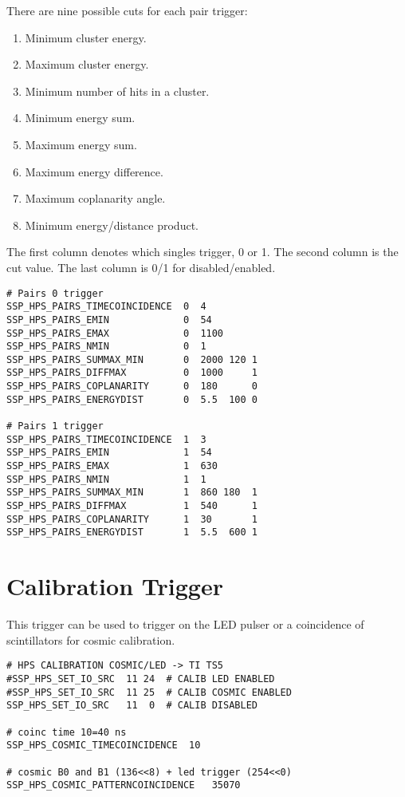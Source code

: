 \documentclass[amsmath,amssymb,notitlepage,11pt]{revtex4-1}
\begin{document}
There are nine possible cuts for each pair trigger:
\begin{enumerate}[itemsep=0mm]
  \item Minimum cluster energy.
  \item Maximum cluster energy.
  \item Minimum number of hits in a cluster.
  \item Minimum energy sum.
  \item Maximum energy sum.
  \item Maximum energy difference.
  \item Maximum coplanarity angle.
  \item Minimum energy/distance product.
\end{enumerate}
The first column denotes which singles trigger, 0 or 1.
The second column is the cut value.
The last column is 0/1 for disabled/enabled.
\begin{verbatim}
# Pairs 0 trigger
SSP_HPS_PAIRS_TIMECOINCIDENCE  0  4
SSP_HPS_PAIRS_EMIN             0  54
SSP_HPS_PAIRS_EMAX             0  1100
SSP_HPS_PAIRS_NMIN             0  1
SSP_HPS_PAIRS_SUMMAX_MIN       0  2000 120 1
SSP_HPS_PAIRS_DIFFMAX          0  1000     1
SSP_HPS_PAIRS_COPLANARITY      0  180      0
SSP_HPS_PAIRS_ENERGYDIST       0  5.5  100 0

# Pairs 1 trigger
SSP_HPS_PAIRS_TIMECOINCIDENCE  1  3
SSP_HPS_PAIRS_EMIN             1  54
SSP_HPS_PAIRS_EMAX             1  630
SSP_HPS_PAIRS_NMIN             1  1
SSP_HPS_PAIRS_SUMMAX_MIN       1  860 180  1
SSP_HPS_PAIRS_DIFFMAX          1  540      1
SSP_HPS_PAIRS_COPLANARITY      1  30       1
SSP_HPS_PAIRS_ENERGYDIST       1  5.5  600 1
\end{verbatim}

\section{Calibration Trigger}
This trigger can be used to trigger on the LED pulser or a coincidence of scintillators for cosmic calibration.
\begin{verbatim}
# HPS CALIBRATION COSMIC/LED -> TI TS5
#SSP_HPS_SET_IO_SRC  11 24  # CALIB LED ENABLED
#SSP_HPS_SET_IO_SRC  11 25  # CALIB COSMIC ENABLED
SSP_HPS_SET_IO_SRC   11  0  # CALIB DISABLED

# coinc time 10=40 ns
SSP_HPS_COSMIC_TIMECOINCIDENCE  10

# cosmic B0 and B1 (136<<8) + led trigger (254<<0)
SSP_HPS_COSMIC_PATTERNCOINCIDENCE   35070
\end{verbatim}
\end{document}
